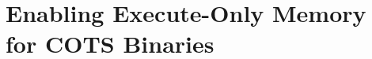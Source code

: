\newcommand{\norax}{\textsc{Norax}\xspace}
\newcommand{\NORAX}{\textsc{Norax}\xspace}
\newcommand{\NDisassembler}{NDisassembler\xspace}
\newcommand{\NPatcher}{NPatcher\xspace}
\newcommand{\NLoader}{NLoader\xspace}
\newcommand{\NMonitor}{NMonitor\xspace}
\section{Enabling Execute-Only Memory for COTS Binaries}








